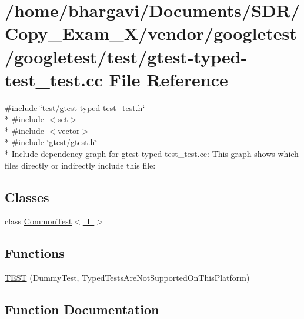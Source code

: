 \hypertarget{gtest-typed-test__test_8cc}{}\section{/home/bhargavi/\+Documents/\+S\+D\+R/\+Copy\+\_\+\+Exam\+\_\+X/vendor/googletest/googletest/test/gtest-\/typed-\/test\+\_\+test.cc File Reference}
\label{gtest-typed-test__test_8cc}
{\ttfamily \#include \char`\"{}test/gtest-\/typed-\/test\+\_\+test.\+h\char`\"{}}\\*
{\ttfamily \#include $<$set$>$}\\*
{\ttfamily \#include $<$vector$>$}\\*
{\ttfamily \#include \char`\"{}gtest/gtest.\+h\char`\"{}}\\*
Include dependency graph for gtest-\/typed-\/test\+\_\+test.cc\+:
This graph shows which files directly or indirectly include this file\+:
\subsection*{Classes}
\begin{DoxyCompactItemize}
\item 
class \hyperlink{class_common_test}{Common\+Test$<$ T $>$}
\end{DoxyCompactItemize}
\subsection*{Functions}
\begin{DoxyCompactItemize}
\item 
\hyperlink{gtest-typed-test__test_8cc_a7d2c906b58ca05100fcea4e00858d2c6}{T\+E\+ST} (Dummy\+Test, Typed\+Tests\+Are\+Not\+Supported\+On\+This\+Platform)
\end{DoxyCompactItemize}


\subsection{Function Documentation}
